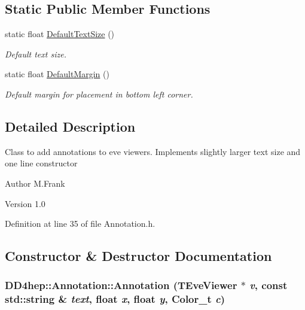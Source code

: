 \subsection*{Static Public Member Functions}
\begin{DoxyCompactItemize}
\item 
static float \hyperlink{class_d_d4hep_1_1_annotation_a935265c70c04d194c2de49408f860db6}{DefaultTextSize} ()
\begin{DoxyCompactList}\small\item\em Default text size. \item\end{DoxyCompactList}\item 
static float \hyperlink{class_d_d4hep_1_1_annotation_a8d10a81577c74708c3458905b5d239dc}{DefaultMargin} ()
\begin{DoxyCompactList}\small\item\em Default margin for placement in bottom left corner. \item\end{DoxyCompactList}\end{DoxyCompactItemize}


\subsection{Detailed Description}
Class to add annotations to eve viewers. Implements slightly larger text size and one line constructor

\begin{DoxyAuthor}{Author}
M.Frank 
\end{DoxyAuthor}
\begin{DoxyVersion}{Version}
1.0 
\end{DoxyVersion}


Definition at line 35 of file Annotation.h.

\subsection{Constructor \& Destructor Documentation}
\hypertarget{class_d_d4hep_1_1_annotation_a8b1b5f5ca85400bf6f580a91f6e7cebc}{
\subsubsection[{Annotation}]{\setlength{\rightskip}{0pt plus 5cm}DD4hep::Annotation::Annotation (TEveViewer $\ast$ {\em v}, \/  const std::string \& {\em text}, \/  float {\em x}, \/  float {\em y}, \/  Color\_\-t {\em c})}}
\label{class_d_d4hep_1_1_annotation_a8b1b5f5ca85400bf6f580a91f6e7cebc}


